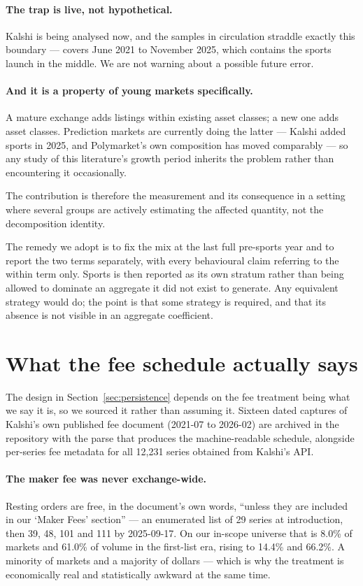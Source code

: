 \documentclass[preprint,12pt,authoryear]{elsarticle}
\begin{document}
\paragraph{The trap is live, not hypothetical.} Kalshi is being analysed now,
and the samples in circulation straddle exactly this boundary ---
\citet{becker2026} covers June 2021 to November 2025, which contains the sports
launch in the middle. We are not warning about a possible future error.

\paragraph{And it is a property of young markets specifically.} A mature
exchange adds listings within existing asset classes; a new one adds asset
classes. Prediction markets are currently doing the latter --- Kalshi added
sports in 2025, and Polymarket's own composition has moved comparably --- so any
study of this literature's growth period inherits the problem rather than
encountering it occasionally.

The contribution is therefore the measurement and its consequence in a setting
where several groups are actively estimating the affected quantity, not the
decomposition identity.

The remedy we adopt is to fix the mix at the last full pre-sports year and to
report the two terms separately, with every behavioural claim referring to the
within term only. Sports is then reported as its own stratum rather than being
allowed to dominate an aggregate it did not exist to generate. Any equivalent
strategy would do; the point is that some strategy is required, and that its
absence is not visible in an aggregate coefficient.

\section{What the fee schedule actually says}\label{sec:fees}

The design in Section~\ref{sec:persistence} depends on the fee treatment being
what we say it is, so we sourced it rather than assuming it. Sixteen dated
captures of Kalshi's own published fee document (2021-07 to 2026-02) are
archived in the repository with the parse that produces the machine-readable
schedule, alongside per-series fee metadata for all 12,231 series obtained from
Kalshi's API.

\paragraph{The maker fee was never exchange-wide.} Resting orders are free, in
the document's own words, ``unless they are included in our `Maker Fees'
section'' --- an enumerated list of 29 series at introduction, then 39, 48, 101
and 111 by 2025-09-17. On our in-scope universe that is 8.0\% of markets and
61.0\% of volume in the first-list era, rising to 14.4\% and 66.2\%. A minority
of markets and a majority of dollars --- which is why the treatment is
economically real and statistically awkward at the same time.
\end{document}
